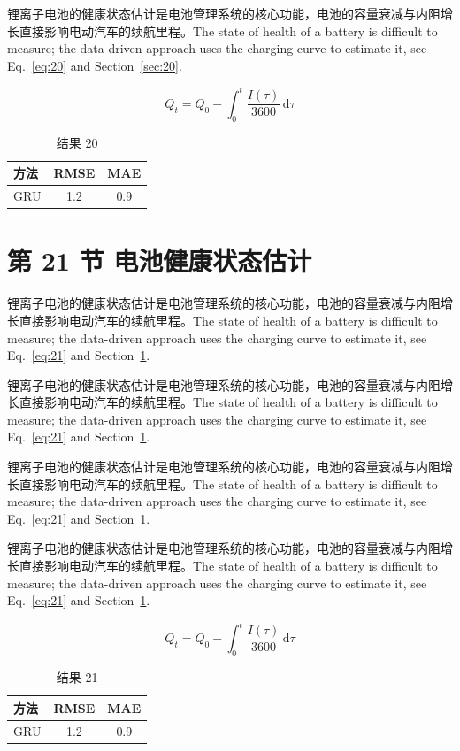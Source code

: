\documentclass[UTF8,fontset=mac]{ctexart}
\begin{document}
锂离子电池的健康状态估计是电池管理系统的核心功能，电池的容量衰减与内阻增长直接影响电动汽车的续航里程\cite{a2020}。The state of health of a battery is difficult to measure; the data-driven approach uses the charging curve to estimate it, see Eq.~\eqref{eq:20} and Section~\ref{sec:20}.

\begin{equation}\label{eq:20}
  Q_t = Q_0 - \int_0^t \frac{I(\tau)}{3600}\,\mathrm{d}\tau
\end{equation}
\begin{table}[h]\centering\begin{tabular}{lcc}\toprule 方法 & RMSE & MAE\\\midrule GRU & 1.2 & 0.9\\\bottomrule\end{tabular}\caption{结果 20}\end{table}

\section{第 21 节 电池健康状态估计}\label{sec:21}
锂离子电池的健康状态估计是电池管理系统的核心功能，电池的容量衰减与内阻增长直接影响电动汽车的续航里程\cite{a2020}。The state of health of a battery is difficult to measure; the data-driven approach uses the charging curve to estimate it, see Eq.~\eqref{eq:21} and Section~\ref{sec:21}.

锂离子电池的健康状态估计是电池管理系统的核心功能，电池的容量衰减与内阻增长直接影响电动汽车的续航里程\cite{a2020}。The state of health of a battery is difficult to measure; the data-driven approach uses the charging curve to estimate it, see Eq.~\eqref{eq:21} and Section~\ref{sec:21}.

锂离子电池的健康状态估计是电池管理系统的核心功能，电池的容量衰减与内阻增长直接影响电动汽车的续航里程\cite{a2020}。The state of health of a battery is difficult to measure; the data-driven approach uses the charging curve to estimate it, see Eq.~\eqref{eq:21} and Section~\ref{sec:21}.

锂离子电池的健康状态估计是电池管理系统的核心功能，电池的容量衰减与内阻增长直接影响电动汽车的续航里程\cite{a2020}。The state of health of a battery is difficult to measure; the data-driven approach uses the charging curve to estimate it, see Eq.~\eqref{eq:21} and Section~\ref{sec:21}.

\begin{equation}\label{eq:21}
  Q_t = Q_0 - \int_0^t \frac{I(\tau)}{3600}\,\mathrm{d}\tau
\end{equation}
\begin{table}[h]\centering\begin{tabular}{lcc}\toprule 方法 & RMSE & MAE\\\midrule GRU & 1.2 & 0.9\\\bottomrule\end{tabular}\caption{结果 21}\end{table}
\end{document}
